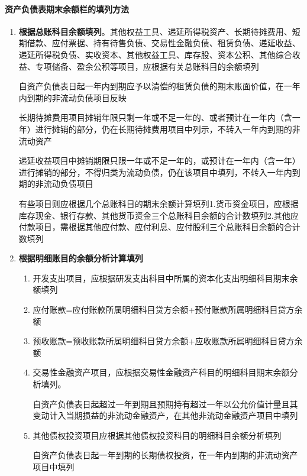 \documentclass[UTF8,12pt]{ctexart}
\numberwithin{equation}{section} %
\numberwithin{figure}{section}
\numberwithin{table}{section}
\begin{document}
	\paragraph{资产负债表期末余额栏的填列方法}
	\begin{enumerate}
		\item \textbf{根据总账科目余额填列}。其他权益工具、递延所得税资产、长期待摊费用、短期借款、应付票据、持有待售负债、交易性金融负债、租赁负债、递延收益、递延所得税负债、实收资本、其他权益工具、库存股、资本公积、其他综合收益、专项储备、盈余公积等项目，应根据有关总账科目的余额填列
		
		自资产负债表日起一年内到期应予以清偿的租赁负债的期末账面价值，在一年内到期的非流动负债项目反映
		
		长期待摊费用项目摊销年限只剩一年或不足一年的、或者预计在一年内（含一年）进行摊销的部分，仍在长期待摊费用项目中列示，不转入一年内到期的非流动资产
		
		递延收益项目中摊销期限只限一年或不足一年的，或预计在一年内（含一年）进行摊销的部分，不得归类为流动负债，仍在该项目中填列，不转入一年内到期的非流动负债项目
		
		有些项目则应根据几个总账科目的期末余额计算填列1.货币资金项目，应根据库存现金、银行存款、其他货币资金三个总账科目余额的合计数填列2.其他应付款项目，需根据其他应付款、应付利息、应付股利三个总账科目余额的合计数填列
		
		\item \textbf{根据明细账目的余额分析计算填列}
		\begin{enumerate}
			\item 开发支出项目，应根据研发支出科目中所属的资本化支出明细科目期末余额填列
			
			\item 应付账款=应付账款所属明细科目贷方余额+预付账款所属明细科目贷方余额
			
			\item 预收账款=预收账款所属明细科目贷方余额+应收账款所属明细科目贷方余额
			
			\item 交易性金融资产项目，应根据交易性金融资产科目的明细科目期末余额分析填列。
			
			自资产负债表日起超过一年到期且预期持有超过一年以公允价值计量且其变动计入当期损益的非流动金融资产，在其他非流动金融资产项目中填列
			
			\item 其他债权投资项目应根据其他债权投资科目的明细科目余额分析填列
			
			自资产负债表日起一年到期的长期债权投资，在一年内到期的非流动资产项目中填列
			

\end{enumerate}
\end{enumerate}
\end{document}
